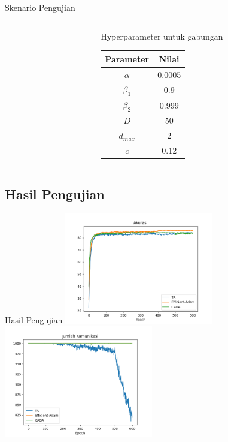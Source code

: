 \documentclass[aspectratio=169]{beamer}
\begin{document}
\begin{frame}{Skenario Pengujian}
\begin{columns}[b]
\begin{column}{3.5cm}
\begin{tabular}{ | c | c | }
        \hline
      \end{tabular}
    \end{column}
    \begin{column}{3.5cm}
      Hyperparameter untuk gabungan \\
      \begin{tabular}{ | c | c | }
        \hline
        \textbf{Parameter} & \textbf{Nilai} \\
        \hline
        $\alpha$           & 0.0005         \\
        \hline
        $\beta_1$          & 0.9            \\
        \hline
        $\beta_2$          & 0.999          \\
        \hline
        $D$                & 50             \\
        \hline
        $d_{max}$          & 2              \\
        \hline
        $c$                & 0.12           \\
        \hline
      \end{tabular}
    \end{column}
  \end{columns}
\end{frame}

\subsection{Hasil Pengujian}
\begin{frame}{Hasil Pengujian}
  \includegraphics[width=6.5cm]{acc.png}
  \includegraphics[width=6.5cm]{comms.png}
\end{frame}
\end{document}
